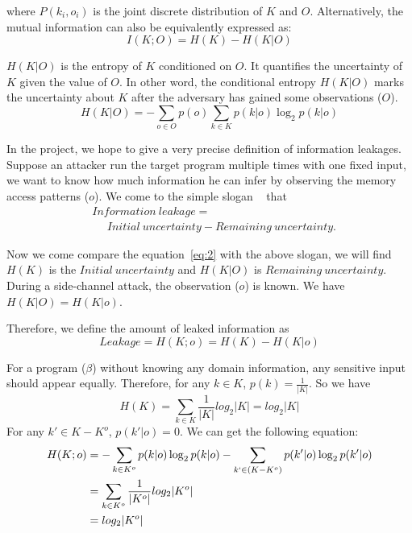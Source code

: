 where $P(k_i, o_i)$ is the joint discrete distribution of $K$ and $O$.
Alternatively, the mutual information can also be equivalently expressed as:
\begin{equation} \label{eq:2}
    I(K;O) = H(K) - H(K|O)
\end{equation}

$H(K|O)$ is the entropy of $K$ conditioned on $O$. It quantifies the uncertainty of $K$
given the value of $O$. In other word, the conditional entropy $H(K|O)$ marks the 
uncertainty about $K$ after the adversary has gained some observations ($O$). 
\begin{equation}
    H(K|O) = - \sum_{o {\in} O} {p(o) \sum_{k {\in} K}{p(k|o)\log_2p(k|o)}}
\end{equation}

In the project, we hope to give a very precise definition of information leakages. 
Suppose an attacker run the target program multiple times with one fixed input, we
want to know how much information he can infer by observing the memory access patterns ($o$).
We come to the simple slogan ~\cite{10.1007/978-3-642-00596-1_21} %
that
\begin{align*}
 & \mathit{Information\ leakage} = \\
 & ~~~~~~ \mathit{Initial\ uncertainty} - \mathit{Remaining\ uncertainty}. 
\end{align*}

Now we come compare the equation~\ref{eq:2} with the above slogan, we will
find $H(K)$ is the $\mathit{Initial\ uncertainty}$ and $H(K|O)$ is
$\mathit{Remaining\ uncertainty}$. During a side-channel attack, 
the observation ($o$) is known.  We have $H(K|O) = H(K|o)$.

Therefore, we define the amount of leaked information as 
\begin{displaymath}
    Leakage = H(K;o) = H(K) - H(K|o)
\end{displaymath}

For a program ($\beta$) without knowing any domain information, any sensitive
input should appear equally. Therefore, for any $k \in K$, $p(k) = \frac{1}{|K|}$.
So we have 
$$H(K) = \sum_{k {\in} K}\frac{1}{|K|}log_2{|K|} = log_2{|K|}$$
For any $k' \in K - K^o$, $p(k'|o) = 0$. We can get the following equation:
\begin{align*}
H(K;o) &= - \sum_{k {\in} K^o}{p(k|o)\log_2p(k|o)} 
          - \sum_{k` {\in} (K - K^o)}{p(k'|o)\log_2p(k'|o)}\\
       &= \sum_{k {\in} K^o}\frac{1}{|K^o|}log_2{|K^o|}\\
       &= log_2{|K^o|}
\end{align*}

